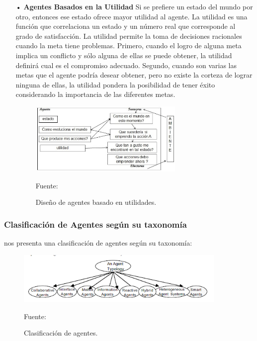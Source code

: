 \begin{itemize}
\item[•] {\bf Agentes Basados en la Utilidad} \vskip 0.1cm
Si se prefiere un estado del mundo por otro, entonces ese estado ofrece mayor utilidad al agente. La utilidad es una función que correlaciona un estado y un número real que corresponde al grado de satisfacción.
\vskip 0.1cm
La utilidad permite la toma de decisiones racionales cuando la meta tiene problemas. Primero, cuando el logro de alguna meta implica un conflicto y sólo alguna de ellas se puede obtener, la utilidad definirá cual es el compromiso adecuado. Segundo, cuando son varias las metas que el agente podría desear obtener, pero no existe la corteza de lograr ninguna de ellas, la utilidad pondera la posibilidad de tener éxito considerando la importancia de las diferentes metas.

\begin{figure}[ht]
\begin{center}
\includegraphics[width=0.7\textwidth]{Imagen6}
\end{center}
\begin{center}
\vskip -0.5cm
\caption{\small{Diseño de agentes basado en utilidades.}}
{\small{Fuente: \cite{Russel}}}
\end{center}
\end{figure}

\end{itemize}

\subsubsection{Clasificación de Agentes según su taxonomía}
\cite{Nwana} nos presenta una clasificación de agentes según su taxonomía:

\begin{figure}[ht]
\begin{center}
\includegraphics[width=0.9\textwidth]{Imagen7}
\end{center}
\begin{center}
\vskip -0.5cm
\caption{\small{Clasificación de agentes.}}
{\small{Fuente: \cite{Nwana}}}
\end{center}
\end{figure}

